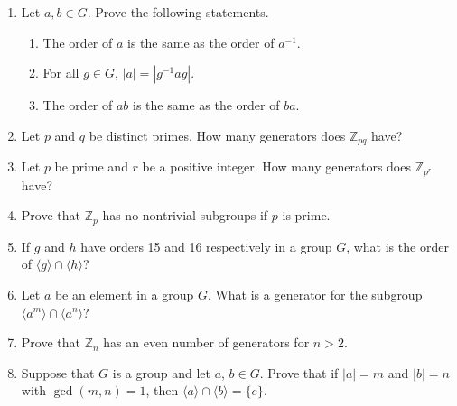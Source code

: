 {\begin{enumerate}
\begin{multicols}{2}
\begin{enumerate}
 \item
$292^{3171} \pmod{ 582}$

\item
$2557^{ 341} \pmod{ 5681}$

 \item
$2071^{ 9521} \pmod{ 4724}$
 
 \item
$971^{ 321} \pmod{ 765}$
 
\end{enumerate}
\end{multicols}
 
 
  
 
\item
Let $a, b \in G$.  Prove the following statements.
\begin{enumerate}
 
 \item
The order of $a$ is the same as the order of $a^{-1}$.
 
 \item
For all $g \in G$, $|a| = |g^{-1}ag|$.
 
 \item
The order of $ab$ is the same as the order of $ba$.
 
\end{enumerate}
 
 
\item
Let $p$ and $q$ be distinct primes.  How many generators does ${\mathbb
Z}_{pq}$ have? 
 
 
\item
Let $p$ be prime and $r$ be a positive integer.  How many generators
does ${\mathbb Z}_{p^r}$ have? 
 
 
\item
Prove that  ${\mathbb Z}_{p}$ has no nontrivial subgroups if $p$ is
prime. 
 
 
\item
If $g$ and $h$ have orders 15 and 16 respectively in a group $G$, what
is the order of $\langle g \rangle  \cap \langle h \rangle $? 
 
 
\item
Let $a$ be an element in a group $G$. What is a generator for the
subgroup $\langle a^m \rangle  \cap  \langle a^n \rangle $?
 
 
\item
Prove that ${\mathbb Z}_n$ has an even number of generators for $n>2$. 
 
 
\item
Suppose that $G$ is a group and let $a$, $b \in G$. Prove that if $|a|
= m$ and $|b| = n$ with $\gcd(m,n) = 1$, then $\langle a \rangle  \cap
\langle b \rangle  = \{ e \}$. 
 

\end{enumerate}}

